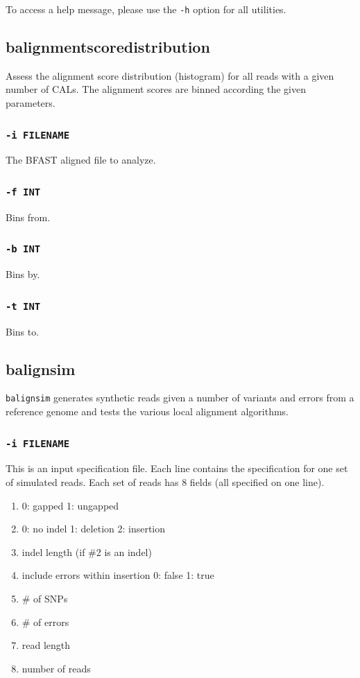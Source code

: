 \documentclass[a4paper,12pt]{book}
\newcommand{\TT}[1]{{\tt #1}} %
\newcommand{\BAF}{BFAST aligned file} %
\begin{document}
To access a help message, please use the \TT{-h} option for all utilities.

\subsection{balignmentscoredistribution}
\label{sec:balignmentscoredistribution}
Assess the alignment score distribution (histogram) for all reads with a given number of CALs.
The alignment scores are binned according the given parameters.
\subsubsection{\TT{-i FILENAME}}
The \BAF{} to analyze.
\subsubsection{\TT{-f INT}}
Bins from.
\subsubsection{\TT{-b INT}}
Bins by.
\subsubsection{\TT{-t INT}}
Bins to.
\subsection{balignsim}
\label{sec:balignsim}
\TT{balignsim} generates synthetic reads given a number of variants and errors from a reference genome and tests the various local alignment algorithms.

\subsubsection{\TT{-i FILENAME}}
This is an input specification file.
Each line contains the specification for one set of simulated reads.
Each set of reads has 8 fields (all specified on one line).
\begin{enumerate}
	\item 0: gapped 1: ungapped
	\item 0: no indel 1: deletion 2: insertion
	\item indel length (if \#2 is an indel)
	\item include errors within insertion 0: false 1: true
	\item \# of SNPs
	\item \# of errors
	\item read length
	\item number of reads
\end{enumerate}
\end{document}
